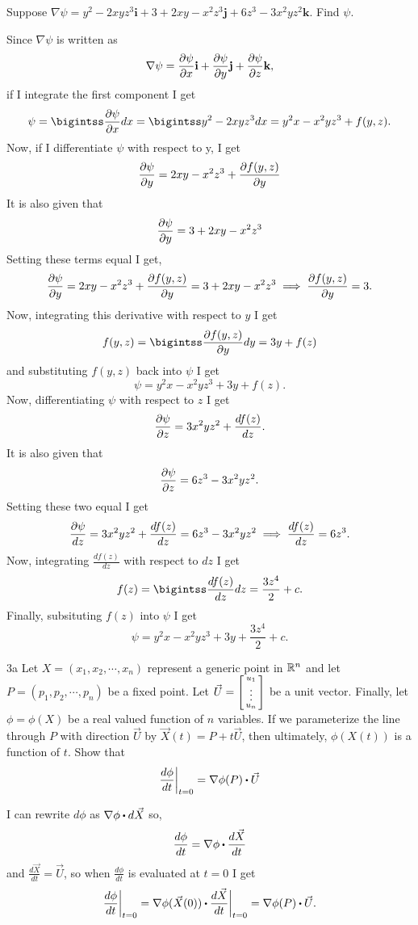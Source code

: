 \documentclass[titlepage]{article}
\begin{document}
\begin{problem}{2}
Suppose $\nabla\psi = y^2 - 2xyz^3\textbf{i} + 3+2xy-x^2z^3\textbf{j} + 6z^3-3x^2yz^2\textbf{k}.$ Find $\psi$.
\end{problem}
\begin{solution}
Since $\nabla\psi$ is written as
$$\nabla\psi = \frac{\partial \psi}{\partial x}\textbf{i} + \frac{\partial \psi}{\partial y}\textbf{j} +  \frac{\partial \psi}{\partial z}\textbf{k},$$
if I integrate the first component I get
$$\psi = \bigintss \frac{\p\psi}{\p x}dx= \bigintss y^2 -2xyz^3dx = y^2x - x^2yz^3 + f(y,z).$$
Now, if I differentiate $\psi$ with respect to y, I get
$$\frac{\partial \psi}{\partial y} = 2xy - x^2z^3 + \frac{\partial f(y,z)}{\partial y}$$
It is also given that
$$\frac{\partial \psi}{\partial y}= 3+ 2xy - x^2z^3$$
Setting these terms equal I get,
$$ \frac{\partial \psi}{\partial y} = 2xy - x^2z^3 + \frac{\partial f(y,z)}{\partial y} = 3+ 2xy - x^2z^3 \implies \frac{\partial f(y,z)}{\partial y} = 3.$$
Now, integrating this derivative with respect to $y$ I get
$$f(y,z) = \bigintss \frac{\p f(y,z)}{\p y} dy = 3y + f(z)$$
and substituting $f(y,z)$ back into $\psi$ I get
$$\psi =  y^2x-x^2yz^3+3y+f(z).$$
Now, differentiating $\psi$ with respect to $z$ I get
$$ \frac{\partial \psi}{\partial z} =  3x^2yz^2+\frac{df(z)}{dz}.$$
It is also given that 
$$\frac{\partial \psi}{\partial z} = 6z^3-3x^2yz^2.$$
Setting these two equal I get
$$ \frac{\partial \psi}{d z} =  3x^2yz^2+\frac{df(z)}{dz}= 6z^3-3x^2yz^2 \implies \frac{df(z)}{dz}=6z^3.$$
Now, integrating $\frac{df(z)}{dz}$ with respect to $dz$ I get
$$f(z) = \bigintss \frac{df(z)}{dz} dz = \frac{3z^4}{2}+ c.$$
Finally, subsituting $f(z)$ into $\psi$ I get 
$$\psi = y^2x-x^2yz^3+3y+\frac{3z^4}{2} + c.$$
\end{solution}

\begin{problem}{3a}
Let $X = (x_1,x_2,\cdots,x_n)$ represent a generic point in $\mathbb{R}^n$ and let $P=(p_1,p_2,\cdots,p_n)$ be a fixed point. Let $\vec{U} = \left[\begin{smallmatrix}u_1\\\vdots\\u_n\end{smallmatrix}\right]$ be a unit vector. Finally, let $\phi= \phi(X)$ be a real valued function of $n$ variables. If we parameterize the line through $P$ with direction $\vec{U}$ by $\vec{X}(t) = P + t\vec{U}$, then ultimately, $\phi(X(t))$ is a function of $t$. Show that 
$$\frac{d \phi}{dt}\bigg\rvert_{t=0} = \nabla\phi(P)\bigcdot\vec{U}$$
\end{problem}

\begin{solution}
I can rewrite $d\phi$ as $\nabla\phi \bigcdot d\vec{X}$ so, 
$$\frac{d\phi}{dt} = \nabla\phi \bigcdot \frac{d\vec{X}}{dt}$$
and $\frac{d\vec{X}}{dt} = \vec{U}$, so when $\frac{d\phi}{dt}$ is evaluated at $t=0$ I get
$$\frac{d\phi}{dt} \bigg\rvert_{t=0} = \nabla\phi(\vec{X}(0)) \bigcdot \frac{d\vec{X}}{dt}\bigg\rvert_{t=0} = \nabla\phi(P) \bigcdot \vec{U}.$$
\end{solution}
\end{document}
